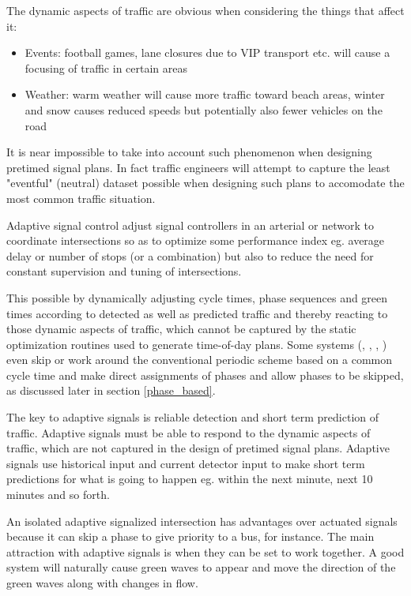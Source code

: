 The dynamic aspects of traffic are obvious when considering the things that affect it:

\begin{itemize}
\item Events: football games, lane closures due to VIP transport etc. will cause a focusing of traffic in certain areas
\item Weather: warm weather will cause more traffic toward beach areas, winter and snow causes reduced speeds but potentially also fewer vehicles on the road
\end{itemize}

It is near impossible to take into account such phenomenon when designing pretimed signal plans. In fact traffic engineers will attempt to capture the least "eventful" (neutral) dataset possible when designing such plans to accomodate the most common traffic situation.

Adaptive signal control adjust signal controllers in an arterial or network to coordinate intersections so as to optimize some performance index eg. average delay or number of stops (or a combination) but also to reduce the need for constant supervision and tuning of intersections.

This possible by dynamically adjusting cycle times, phase sequences and green times according to detected as well as predicted traffic and thereby reacting to those dynamic aspects of traffic, which cannot be captured by the static optimization routines used to generate time-of-day plans. Some systems (\cite{phase_by_phase}, \cite{rhodes}, \cite{opac}, \cite{scoot}) even skip or work around the conventional periodic scheme based on a common cycle time and make direct assignments of phases and allow phases to be skipped, as discussed later in section \ref{phase_based}. 

The key to adaptive signals is reliable detection and short term prediction of traffic. Adaptive signals must be able to respond to the dynamic aspects of traffic, which are not captured in the design of pretimed signal plans. Adaptive signals use historical input and current detector input to make short term predictions for what is going to happen eg. within the next minute, next 10 minutes and so forth.

An isolated adaptive signalized intersection has advantages over actuated signals because it can skip a phase to give priority to a bus, for instance. The main attraction with adaptive signals is when they can be set to work together. A good system will naturally cause green waves to appear and move the direction of the green waves along with changes in flow.

